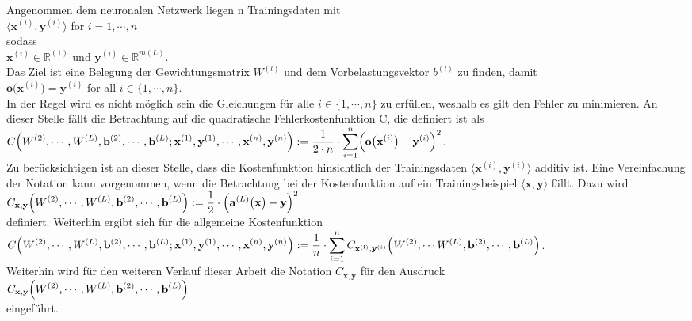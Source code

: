 Angenommen dem neuronalen Netzwerk liegen n Trainingsdaten mit
\\[0.2cm]
\hspace*{1.3cm}
$\langle \mathbf{x}^{(i)}, \mathbf{y}^{(i)} \rangle$ \quad for $i=1,\cdots,n$ 
\\[0.2cm]
sodass 
\\[0.2cm]
\hspace*{1.3cm}
$\mathbf{x}^{(i)} \in \mathbb{R}^{(1)}$ und $\mathbf{y}^{(i)} \in \mathbb{R}^{m(L)}$.
\\[0.2cm]
Das Ziel ist eine Belegung der Gewichtungsmatrix $W^{(l)}$ und dem Vorbelastungsvektor $b^{(l)}$ zu finden, damit
\\[0.2cm]
\hspace*{1.3cm}
$\mathbf{o}\bigl(\mathbf{x}^{(i)}\bigr) = \mathbf{y}^{(i)}$ \quad for all $i \in \{1,\cdots,n\}$.
\\[0.2cm]
In der Regel wird es nicht möglich sein die Gleichungen für alle $i \in \{ 1, \cdots ,n \}$ zu erfüllen, weshalb es gilt den Fehler zu minimieren. An dieser Stelle fällt die Betrachtung auf die quadratische Fehlerkostenfunktion C, die definiert ist als
\\[0.2cm]
\hspace*{1.3cm}
$\displaystyle C\Bigr(W^{(2)}, \cdots, W^{(L)}, \mathbf{b}^{(2)}, \cdots, \mathbf{b}^{(L)};
     \mathbf{x}^{(1)}, \mathbf{y}^{(1)}, \cdots, \mathbf{x}^{(n)},\mathbf{y}^{(n)} \Bigr) := 
 \frac{1}{2 \cdot n} \cdot \sum\limits_{i=1}^n \Bigl(\mathbf{o}\bigl(\mathbf{x}^{(i)}\bigr) - \mathbf{y}^{(i)}\Bigr)^2
$.
\\[0.2cm]
Zu berücksichtigen ist an dieser Stelle, dass die Kostenfunktion hinsichtlich der Trainingsdaten $\langle \mathbf{x}^{(i)},\mathbf{y}^{(i)} \rangle$ additiv ist. Eine Vereinfachung der Notation kann vorgenommen, wenn die Betrachtung bei der Kostenfunktion auf ein Trainingsbeispiel $\langle \mathbf{x},\mathbf{y} \rangle$ fällt. Dazu wird
\\[0.2cm]
\hspace*{1.3cm}
$\displaystyle C_{\mathbf{x}, \mathbf{y}}\Bigr(W^{(2)}, \cdots, W^{(L)}, \mathbf{b}^{(2)}, \cdots, \mathbf{b}^{(L)}\Bigr) := 
 \frac{1}{2} \cdot \Bigl(\mathbf{a}^{(L)}\bigl(\mathbf{x}\bigr) - \mathbf{y}\Bigr)^2
$
\\[0.2cm]
definiert. Weiterhin ergibt sich für die allgemeine Kostenfunktion
\\[0.2cm]
$\displaystyle C\Bigr(W^{(2)}, \cdots, W^{(L)}, \mathbf{b}^{(2)}, \cdots, \mathbf{b}^{(L)};
     \mathbf{x}^{(1)}, \mathbf{y}^{(1)}, \cdots, \mathbf{x}^{(n)},\mathbf{y}^{(n)} \Bigr) := 
 \frac{1}{n} \cdot \sum\limits_{i=1}^n C_{\mathbf{x^{(i)}}, \mathbf{y}^{(i)}}\Bigr(W^{(2)}, \cdots W^{(L)}, \mathbf{b}^{(2)}, \cdots, \mathbf{b}^{(L)}\Bigr) 
$.
\\[0.2cm]
Weiterhin wird für den weiteren Verlauf dieser Arbeit die Notation $C_{\mathbf{x}, \mathbf{y}}$ für den Ausdruck
\\[0.2cm]
\hspace*{1.3cm}
$\displaystyle C_{\mathbf{x}, \mathbf{y}}\Bigr(W^{(2)}, \cdots, W^{(L)}, \mathbf{b}^{(2)}, \cdots, \mathbf{b}^{(L)}\Bigr)$
\\[0.2cm]
eingeführt.



